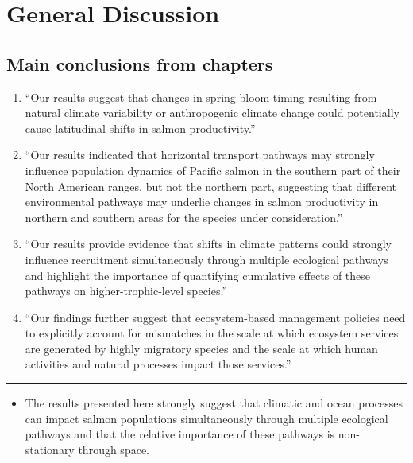 \chapter{General Discussion}\label{general-discussion}

\section{Main conclusions from
chapters}\label{main-conclusions-from-chapters}

\begin{enumerate}
\def\labelenumi{\arabic{enumi}.}
\item
  ``Our results suggest that changes in spring bloom timing resulting
  from natural climate variability or anthropogenic climate change could
  potentially cause latitudinal shifts in salmon productivity.''
\item
  ``Our results indicated that horizontal transport pathways may
  strongly influence population dynamics of Pacific salmon in the
  southern part of their North American ranges, but not the northern
  part, suggesting that different environmental pathways may underlie
  changes in salmon productivity in northern and southern areas for the
  species under consideration.''
\item
  ``Our results provide evidence that shifts in climate patterns could
  strongly influence recruitment simultaneously through multiple
  ecological pathways and highlight the importance of quantifying
  cumulative effects of these pathways on higher-trophic-level
  species.''
\item
  ``Our findings further suggest that ecosystem-based management
  policies need to explicitly account for mismatches in the scale at
  which ecosystem services are generated by highly migratory species and
  the scale at which human activities and natural processes impact those
  services.''
\end{enumerate}

\begin{center}\rule{0.5\linewidth}{\linethickness}\end{center}

\begin{itemize}
\tightlist
\item
  The results presented here strongly suggest that climatic and ocean
  processes can impact salmon populations simultaneously through
  multiple ecological pathways and that the relative importance of these
  pathways is non-stationary through space.
\end{itemize}

